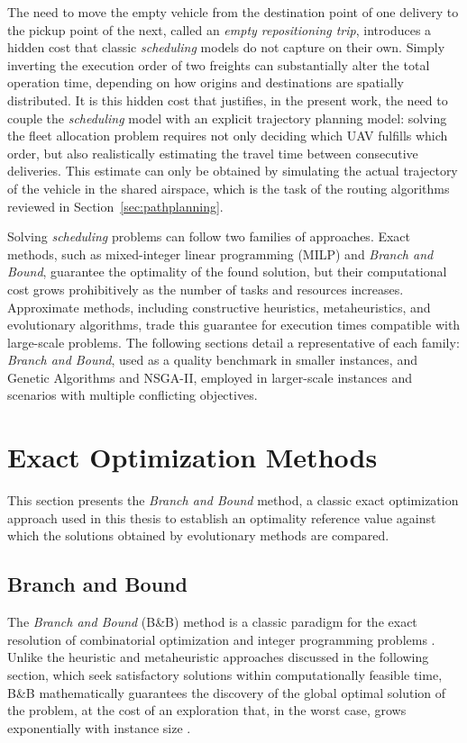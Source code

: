 The need to move the empty vehicle from the destination point of one delivery to the pickup point of the next, called an \textit{empty repositioning trip}, introduces a hidden cost that classic \textit{scheduling} models do not capture on their own. Simply inverting the execution order of two freights can substantially alter the total operation time, depending on how origins and destinations are spatially distributed. It is this hidden cost that justifies, in the present work, the need to couple the \textit{scheduling} model with an explicit trajectory planning model: solving the fleet allocation problem requires not only deciding which UAV fulfills which order, but also realistically estimating the travel time between consecutive deliveries. This estimate can only be obtained by simulating the actual trajectory of the vehicle in the shared airspace, which is the task of the routing algorithms reviewed in Section~\ref{sec:pathplanning}.

Solving \textit{scheduling} problems can follow two families of approaches. Exact methods, such as mixed-integer linear programming (MILP) and \textit{Branch and Bound}, guarantee the optimality of the found solution, but their computational cost grows prohibitively as the number of tasks and resources increases. Approximate methods, including constructive heuristics, metaheuristics, and evolutionary algorithms, trade this guarantee for execution times compatible with large-scale problems. The following sections detail a representative of each family: \textit{Branch and Bound}, used as a quality benchmark in smaller instances, and Genetic Algorithms and NSGA-II, employed in larger-scale instances and scenarios with multiple conflicting objectives.

\section{Exact Optimization Methods}\label{sec:bnb}

This section presents the \textit{Branch and Bound} method, a classic exact optimization approach used in this thesis to establish an optimality reference value against which the solutions obtained by evolutionary methods are compared.

\subsection{Branch and Bound}

The \textit{Branch and Bound} (B\&B) method is a classic paradigm for the exact resolution of combinatorial optimization and integer programming problems \cite{Land1960, Little1963}. Unlike the heuristic and metaheuristic approaches discussed in the following section, which seek satisfactory solutions within computationally feasible time, B\&B mathematically guarantees the discovery of the global optimal solution of the problem, at the cost of an exploration that, in the worst case, grows exponentially with instance size \cite{Wolsey1998}.

